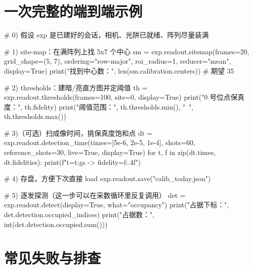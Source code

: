\documentclass[11pt,oneside,openany]{book}
\begin{document}
\section{一次完整的端到端示例}

\begin{codeblock}[Python]
# 0) 假设 exp 是已建好的会话，相机、光阱已就绪、阵列尽量装满

# 1) site-map：在满阵列上找 5x7 个中心
sm = exp.readout.sitemap(frames=20, grid_shape=(5, 7),
                         ordering="row-major", roi_radius=1,
                         reducer="mean", display=True)
print("找到中心数：", len(sm.calibration.centers))  # 期望 35

# 2) thresholds：建暗/亮直方图并定阈值
th = exp.readout.thresholds(frames=100, site=0, display=True)
print("0 号位点保真度：", th.fidelity)
print("阈值范围：", th.thresholds.min(), "~", th.thresholds.max())

# 3)（可选）扫成像时间，挑保真度饱和点
dt = exp.readout.detection_time(times=[5e-6, 2e-5, 1e-4],
                                shots=60, reference_shots=30,
                                live=True, display=True)
for t, f in zip(dt.times, dt.fidelities):
    print(f"t={t:g}s -> fidelity={f:.4f}")

# 4) 存盘，方便下次直接 load
exp.readout.save("calib_today.json")

# 5) 逐发探测（这一步可以在采数循环里反复调用）
det = exp.readout.detect(display=True, what="occupancy")
print("占据下标：", det.detection.occupied_indices)
print("占据数：", int(det.detection.occupied.sum()))
\end{codeblock}

\section{常见失败与排查}
\end{document}
